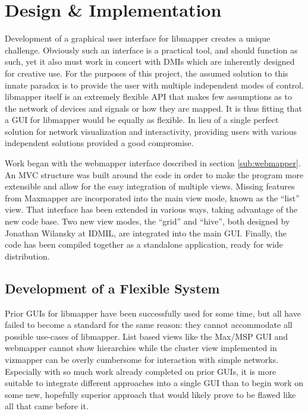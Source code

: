 \chapter{Design \& Implementation}

	Development of a graphical user interface for libmapper creates a unique challenge. Obviously such an interface is a practical tool, and should function as such, yet it also must work in concert with DMIs which are inherently designed for creative use. For the purposes of this project, the assumed solution to this innate paradox is to provide the user with multiple independent modes of control.  libmapper itself is an extremely flexible API that makes few assumptions as to the network of devices and signals or how they are mapped. It is thus fitting that a GUI for libmapper would be equally as flexible. In lieu of a single perfect solution for network visualization and interactivity, providing users with various independent solutions provided a good compromise.

	Work began with the webmapper interface described in section \ref{sub:webmapper}. An MVC structure was built around the code in order to make the program more extensible and allow for the easy integration of multiple views. Missing features from Maxmapper are incorporated into the main view mode, known as the ``list'' view. That interface has been extended in various ways, taking advantage of the new code base. Two new view modes, the ``grid'' and ``hive'', both designed by Jonathan Wilansky at IDMIL, are integrated into the main GUI. Finally, the code has been compiled together as a standalone application, ready for wide distribution.

\section{Development of a Flexible System} %
\label{sec:development_of_a_flexible_system}

Prior GUIs for libmapper have been successfully used for some time, but all have failed to become a standard for the same reason: they cannot accommodate all possible use-cases of libmapper. List based views like the Max/MSP GUI and webmapper cannot show hierarchies while the cluster view implemented in vizmapper can be overly cumbersome for interaction with simple networks. Especially with so much work already completed on prior GUIs, it is more suitable to integrate different approaches into a single GUI than to begin work on some new, hopefully superior approach that would likely prove to be flawed like all that came before it. 

